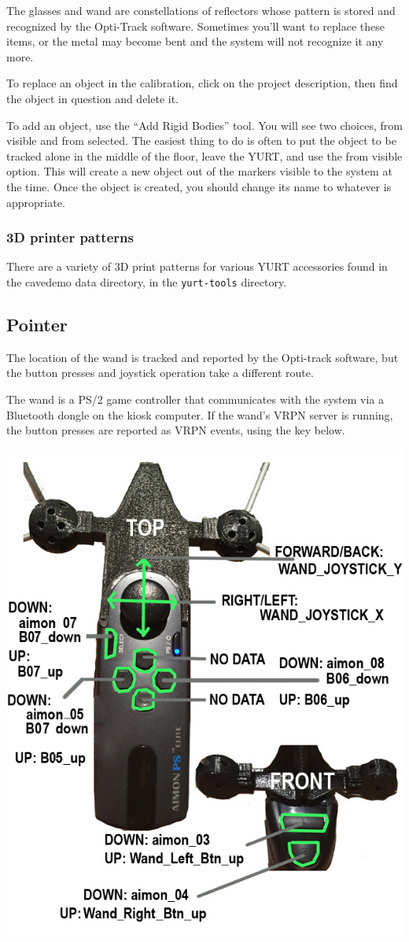 \documentclass[11pt]{article}
\newcommand{\yurt}{YURT\xspace}
\newcommand{\cmd}[1]{\texttt{#1}\xspace}
\newcommand{\menu}[1]{``#1''\xspace}
\newcommand{\button}[1]{\textsf{#1}\xspace}
\begin{document}
The glasses and wand are constellations of reflectors whose pattern is
stored and recognized by the Opti-Track software.  Sometimes you'll
want to replace these items, or the metal may become bent and the
system will not recognize it any more.

To replace an object in the calibration, click on the project
description, then find the object in question and delete it.

To add an object, use the \menu{Add Rigid Bodies} tool.  You will see two
choices, \button{from visible} and \button{from selected}.  The easiest thing to
do is often to put the object to be tracked alone in the middle of the
floor, leave the \yurt, and use the \button{from visible} option.  This
will create a new object out of the markers visible to the system at
the time.  Once the object is created, you should change its name to
whatever is appropriate.


\subsubsection{3D printer patterns}

There are a variety of 3D print patterns for various \yurt accessories
found in the cavedemo data directory, in the \cmd{yurt-tools} directory.


\subsection{Pointer}

The location of the wand is tracked and reported by the Opti-track
software, but the button presses and joystick operation take a
different route.

The wand is a PS/2 game controller that communicates with the system
via a Bluetooth dongle on the kiosk
computer.  If the wand's VRPN server is running, the button presses
are reported as VRPN events, using the key below.

\begin{center}
\includegraphics[width=0.6\columnwidth]{yurt-wand-controller.jpg}
\end{center}
\end{document}
